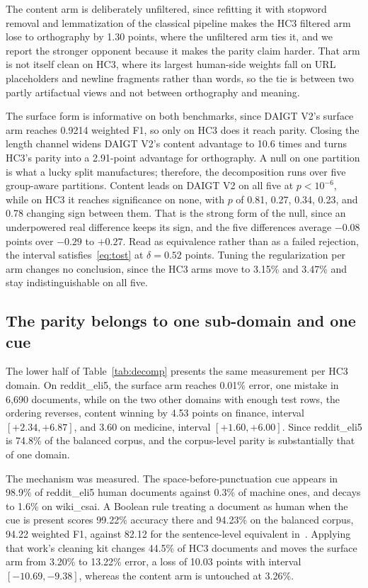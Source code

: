 \documentclass[conference,a4paper]{IEEEtran}
\newcommand{\tabref}[1]{\hyperref[#1]{\ref*{#1}}}
\begin{document}
The content arm is deliberately unfiltered, since refitting it with stopword removal and lemmatization of the classical pipeline makes the HC3 filtered arm lose to orthography by 1.30 points, where the unfiltered arm ties it, and we report the stronger opponent because it makes the parity claim harder. That arm is not itself clean on HC3, where its largest human-side weights fall on URL placeholders and newline fragments rather than words, so the tie is between two partly artifactual views and not between orthography and meaning.

The surface form is informative on both benchmarks, since DAIGT V2's surface arm reaches 0.9214 weighted F1, so only on HC3 does it reach parity. Closing the length channel widens DAIGT V2's content advantage to 10.6 times and turns HC3's parity into a 2.91-point advantage for orthography. A null on one partition is what a lucky split manufactures; therefore, the decomposition runs over five group-aware partitions. Content leads on DAIGT V2 on all five at $p < 10^{-6}$, while on HC3 it reaches significance on none, with $p$ of 0.81, 0.27, 0.34, 0.23, and 0.78 changing sign between them. That is the strong form of the null, since an underpowered real difference keeps its sign, and the five differences average $-0.08$ points over $-0.29$ to $+0.27$. Read as equivalence rather than as a failed rejection, the interval satisfies~\eqref{eq:tost} at $\delta = 0.52$ points. Tuning the regularization per arm changes no conclusion, since the HC3 arms move to 3.15\% and 3.47\% and stay indistinguishable on all five.

\subsection{The parity belongs to one sub-domain and one cue}
\label{sec:subgroup}

The lower half of Table~\tabref{tab:decomp} presents the same measurement per HC3 domain. On reddit\_eli5, the surface arm reaches 0.01\% error, one mistake in 6,690 documents, while on the two other domains with enough test rows, the ordering reverses, content winning by 4.53 points on finance, interval $[+2.34, +6.87]$, and 3.60 on medicine, interval $[+1.60, +6.00]$. Since reddit\_eli5 is 74.8\% of the balanced corpus, and the corpus-level parity is substantially that of one domain.

The mechanism was measured. The space-before-punctuation cue appears in 98.9\% of reddit\_eli5 human documents against 0.3\% of machine ones, and decays to 1.6\% on wiki\_csai. A Boolean rule treating a document as human when the cue is present scores 99.22\% accuracy there and 94.23\% on the balanced corpus, 94.22 weighted F1, against 82.12 for the sentence-level equivalent in~\cite{Tian2023multiscale}. Applying that work's cleaning kit changes 44.5\% of HC3 documents and moves the surface arm from 3.20\% to 13.22\% error, a loss of 10.03 points with interval $[-10.69, -9.38]$, whereas the content arm is untouched at 3.26\%.
\end{document}
